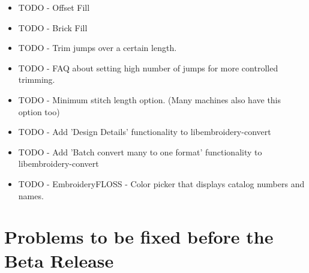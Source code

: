\documentclass{report}
\begin{document}
\begin{itemize}
\item TODO - Offset Fill
\item TODO - Brick Fill
\item TODO - Trim jumps over a certain length.
\item TODO - FAQ about setting high number of jumps for more controlled trimming.
\item TODO - Minimum stitch length option. (Many machines also have this option too)
\item TODO - Add 'Design Details' functionality to libembroidery-convert
\item TODO - Add 'Batch convert many to one format' functionality to libembroidery-convert
\item TODO - EmbroideryFLOSS - Color picker that displays catalog numbers and names.
\end{itemize}

\section{Problems to be fixed before the Beta Release}
\end{document}
